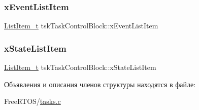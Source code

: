 \mbox{\label{structtsk_task_control_block_a1a1612b6081a13683808284d93a9b28f}} 
\subsubsection{\texorpdfstring{xEventListItem}{xEventListItem}}
{\footnotesize\ttfamily \mbox{\hyperlink{list_8h_a1a62d469392f9bfe2443e7efab9c8398}{List\+Item\+\_\+t}} tsk\+Task\+Control\+Block\+::x\+Event\+List\+Item}

\mbox{\label{structtsk_task_control_block_a16e0d20425d53ac78537e1fdb8834cf6}} 
\subsubsection{\texorpdfstring{xStateListItem}{xStateListItem}}
{\footnotesize\ttfamily \mbox{\hyperlink{list_8h_a1a62d469392f9bfe2443e7efab9c8398}{List\+Item\+\_\+t}} tsk\+Task\+Control\+Block\+::x\+State\+List\+Item}



Объявления и описания членов структуры находятся в файле\+:\begin{DoxyCompactItemize}
\item 
Free\+R\+T\+O\+S/\mbox{\hyperlink{tasks_8c}{tasks.\+c}}\end{DoxyCompactItemize}
